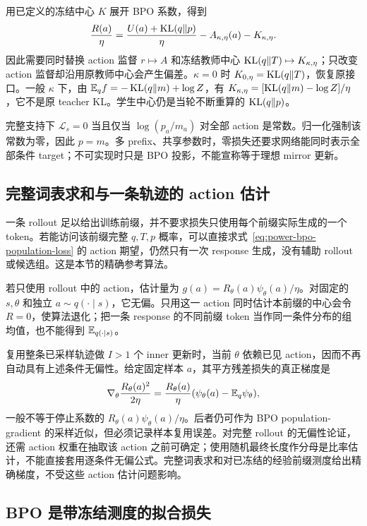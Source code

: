 用已定义的冻结中心 $K$ 展开 BPO 系数，得到
\begin{equation}
 \frac{R(a)}\eta
 =\frac{U(a)+\operatorname{KL}(q\Vert p)}\eta-A_{\kappa,\eta}(a)-K_{\kappa,\eta}.
\end{equation}
因此需要同时替换 action 监督 $r\mapsto A$ 和冻结教师中心 $\operatorname{KL}(q\Vert T)\mapsto K_{\kappa,\eta}$；只改变 action 监督却沿用原教师中心会产生偏差。$\kappa=0$ 时 $K_{0,\eta}=\operatorname{KL}(q\Vert T)$，恢复原接口。一般 $\kappa$ 下，由 $\mathbb E_qf=-\operatorname{KL}(q\Vert m)+\log Z$，有 $K_{\kappa,\eta}=[\operatorname{KL}(q\Vert m)-\log Z]/\eta$，它不是原 teacher KL。学生中心仍是当轮不断重算的 $\operatorname{KL}(q\Vert p)$。

完整支持下 $\mathcal L_s=0$ 当且仅当 $\log(p_a/m_a)$ 对全部 action 是常数。归一化强制该常数为零，因此 $p=m$。多 prefix、共享参数时，零损失还要求网络能同时表示全部条件 target；不可实现时只是 BPO 投影，不能宣称等于理想 mirror 更新。
\subsection{完整词表求和与一条轨迹的 action 估计}

一条 rollout 足以给出训练前缀，并不要求损失只使用每个前缀实际生成的一个 token。若能访问该前缀完整 $q,T,p$ 概率，可以直接求式~\eqref{eq:power-bpo-population-loss} 的 action 期望，仍然只有一次 response 生成，没有辅助 rollout 或候选组。这是本节的精确参考算法。

若只使用 rollout 中的 action，估计量为 $g(a)=R_\theta(a)\psi_\theta(a)/\eta$。对固定的 $s,\theta$ 和独立 $a\sim q(\cdot\mid s)$，它无偏。只用这一 action 同时估计本前缀的中心会令 $R=0$，使算法退化；把一条 response 的不同前缀 token 当作同一条件分布的组均值，也不能得到 $\mathbb E_{q(\cdot\mid s)}$。

复用整条已采样轨迹做 $I>1$ 个 inner 更新时，当前 $\theta$ 依赖已见 action，因而不再自动具有上述条件无偏性。给定固定样本 $a$，其平方残差损失的真正梯度是
\begin{equation}
 \nabla_\theta\frac{R_\theta(a)^2}{2\eta}
 =\frac{R_\theta(a)}\eta(\psi_\theta(a)-\mathbb E_q\psi_\theta),
\end{equation}
一般不等于停止系数的 $R_\theta(a)\psi_\theta(a)/\eta$。后者仍可作为 BPO population-gradient 的采样近似，但必须记录样本复用误差。对完整 rollout 的无偏性论证，还需 action 权重在抽取该 action 之前可确定；使用随机最终长度作分母是比率估计，不能直接套用逐条件无偏公式。完整词表求和对已冻结的经验前缀测度给出精确梯度，不受这些 action 估计问题影响。
\subsection{BPO 是带冻结测度的拟合损失}

